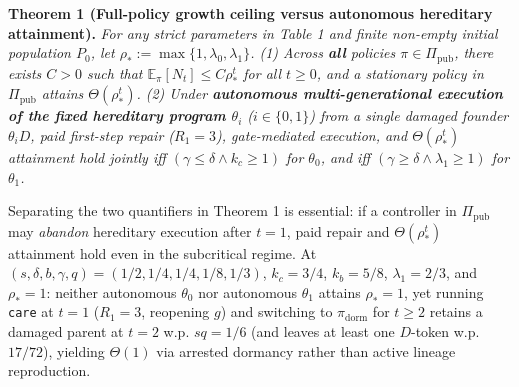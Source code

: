 \documentclass[11pt,letterpaper]{article}
\begin{document}
\textbf{Theorem 1 (Full-policy growth ceiling versus autonomous
hereditary attainment).} \emph{For any strict parameters in Table 1 and
finite non-empty initial population \(P_0\), let
\(\rho_* := \max\{1, \lambda_0, \lambda_1\}\). (1) Across \textbf{all}
policies \(\pi \in \Pi_{\mathrm{pub}}\), there exists \(C > 0\) such
that \(\mathbb{E}_\pi[N_t] \le C \rho_*^t\) for all \(t \ge 0\), and a
stationary policy in \(\Pi_{\mathrm{pub}}\) attains
\(\Theta(\rho_*^t)\). (2) Under \textbf{autonomous multi-generational
execution of the fixed hereditary program \(\theta_i\)}
(\(i \in \{0,1\}\)) from a single damaged founder \(\theta_i D\), paid
first-step repair (\(R_1=3\)), gate-mediated execution, and
\(\Theta(\rho_*^t)\) attainment hold jointly iff
\((\gamma \le \delta \land k_c \ge 1)\) for \(\theta_0\), and iff
\((\gamma \ge \delta \land \lambda_1 \ge 1)\) for \(\theta_1\).}

Separating the two quantifiers in Theorem 1 is essential: if a
controller in \(\Pi_{\mathrm{pub}}\) may \emph{abandon} hereditary
execution after \(t=1\), paid repair and \(\Theta(\rho_*^t)\) attainment
hold even in the subcritical regime. At
\((s,\delta,b,\gamma,q) = (1/2, 1/4, 1/4, 1/8, 1/3)\), \(k_c = 3/4\),
\(k_b = 5/8\), \(\lambda_1 = 2/3\), and \(\rho_* = 1\): neither
autonomous \(\theta_0\) nor autonomous \(\theta_1\) attains
\(\rho_*=1\), yet running \texttt{care} at \(t=1\) (\(R_1=3\), reopening
\(g\)) and switching to \(\pi_{\mathrm{dorm}}\) for \(t \ge 2\) retains
a damaged parent at \(t=2\) w.p. \(sq = 1/6\) (and leaves at least one
\(D\)-token w.p. \(17/72\)), yielding \(\Theta(1)\) via arrested
dormancy rather than active lineage reproduction.
\end{document}
